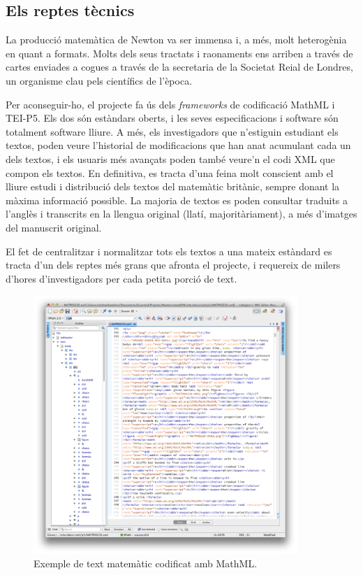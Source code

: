 \documentclass[a4paper, 11pt]{article}
\begin{document}
\subsection*{Els reptes tècnics}

La producció matemàtica de Newton va ser immensa i, a més, molt heterogènia en quant a formats. Molts dels seus
tractats i raonaments ens arriben a través de cartes enviades a co\lgem{}gues a través de la secretaria de la Societat
Reial de Londres, un organisme clau pels científics de l'època.

Per aconseguir-ho, el projecte fa ús dels \textit{frameworks} de codificació MathML i TEI-P5. Els dos són estàndars
oberts, i les seves especificacions i software són totalment software lliure. A més, els investigadors que n'estiguin
estudiant els textos, poden veure l'historial de modificacions que han anat acumulant cada un dels textos, i els
usuaris més avançats poden també veure'n el codi XML que compon els textos. En definitiva, es tracta d'una feina molt
conscient amb el lliure estudi i distribució dels textos del matemàtic britànic, sempre donant la màxima informació
possible. La majoria de textos es poden consultar traduits a l'anglès i transcrits en la llengua original (llatí,
majoritàriament), a més d'imatges del manuscrit original.

El fet de centralitzar i normalitzar tots els textos a una mateix estàndard es tracta d'un dels reptes més grans que
afronta el projecte, i requereix de milers d'hores d'investigadors per cada petita porció de text.

\begin{figure}[H]
  \centering
  \includegraphics[width=10cm]{exemple-newtonproject.png}
  \caption{Exemple de text matemàtic codificat amb MathML.~\cite{bib:fig:exemple}}
\end{figure}
\end{document}
